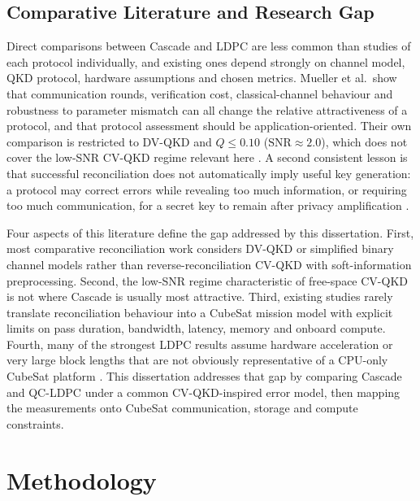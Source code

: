 \documentclass{UoYCSproject}
\begin{document}
\section{Comparative Literature and Research Gap}
\label{sec:lit-comparative}

Direct comparisons between Cascade and LDPC are less common than studies of
each protocol individually, and existing ones depend strongly on channel
model, QKD protocol, hardware assumptions and chosen metrics. Mueller et al.\
show that communication rounds, verification cost, classical-channel behaviour
and robustness to parameter mismatch can all change the relative attractiveness
of a protocol, and that protocol assessment should be application-oriented.
Their own comparison is restricted to DV-QKD and $Q \le 0.10$
($\mathrm{SNR}\!\approx\!2.0$), which does not cover the low-SNR CV-QKD regime
relevant here \cite{mueller_performance_2025, jordan-parra_evaluation_2024}.
A second consistent lesson is that successful reconciliation does not
automatically imply useful key generation: a protocol may correct errors while
revealing too much information, or requiring too much communication, for a
secret key to remain after privacy amplification
\cite{mueller_performance_2025, tupkary_using_2023}.

Four aspects of this literature define the gap addressed by this dissertation.
First, most comparative reconciliation work considers DV-QKD or simplified
binary channel models rather than reverse-reconciliation CV-QKD with
soft-information preprocessing. Second, the low-SNR regime characteristic of
free-space CV-QKD is not where Cascade is usually most attractive. Third,
existing studies rarely translate reconciliation behaviour into a CubeSat
mission model with explicit limits on pass duration, bandwidth, latency, memory
and onboard compute. Fourth, many of the strongest LDPC results assume hardware
acceleration or very large block lengths that are not obviously representative
of a CPU-only CubeSat platform
\cite{milicevic_quasi-cyclic_2018, mueller_performance_2025,
jordan-parra_evaluation_2024, simmons_hogs_2025}. This dissertation addresses that gap by comparing Cascade and QC-LDPC under a
common CV-QKD-inspired error model, then mapping the measurements onto CubeSat
communication, storage and compute constraints.

\chapter{Methodology}
\label{cha:methodology}
\end{document}
